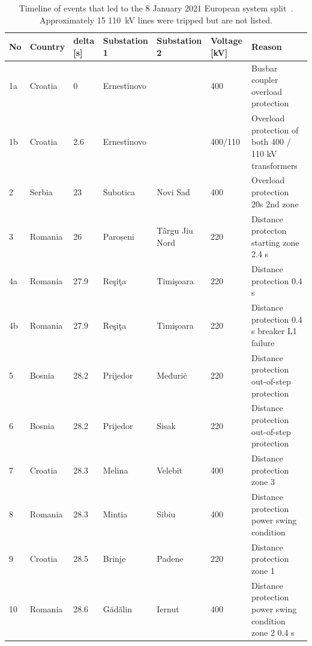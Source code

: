 \begin{landscape}%
\centering
\begin{table}
\centering
\caption{Timeline of events that led to the 8 January 2021 European system split~\cite{ENTSOESplitJan2021}. Approximately 15 110~kV lines were tripped but are not listed.}
\label{tab:split_timeline}
\begin{adjustbox}{max width=\linewidth}
\begin{tabular}{@{}lllllll@{}}
\toprule
No & Country & delta [s] & Substation 1 & Substation 2   & Voltage [kV] & Reason                                                 \\ \midrule
1a & Croatia & 0         & Ernestinovo  &                & 400          & Busbar coupler overload protection                     \\
1b & Croatia & 2.6       & Ernestinovo  &                & 400/110      & Overload protection of both 400 / 110 kV transformers  \\
2  & Serbia  & 23        & Subotica     & Novi Sad       & 400          & Overload protection 20s 2nd zone                       \\
3  & Romania & 26        & Paroșeni     & Târgu Jiu Nord & 220          & Distance protecton starting zone 2.4 s                 \\
4a & Romania & 27.9      & Reşiţa       & Timişoara      & 220          & Distance protection 0.4 s                              \\
4b & Romania & 27.9      & Reşiţa       & Timişoara      & 220          & Distance protection 0.4 s breaker L1 failure           \\
5  & Bosnia  & 28.2      & Prijedor     & Međuriċ        & 220          & Distance protection out-of-step protection             \\
6  & Bosnia  & 28.2      & Prijedor     & Sisak          & 220          & Distance protection out-of-step protection             \\
7  & Croatia & 28.3      & Melina       & Velebit        & 400          & Distance protection zone 3                             \\
8  & Romania & 28.3      & Mintia       & Sibiu          & 400          & Distance protection power swing condition              \\
9  & Croatia & 28.5      & Brinje       & Padene         & 220          & Distance protection zone 1                             \\
10 & Romania & 28.6      & Gădălin      & Iernut         & 400          & Distance protection power swing condition zone 2 0.4 s \\

\end{tabular}
\end{adjustbox}
\end{table}
\end{landscape}

